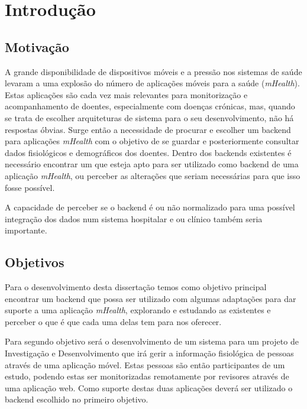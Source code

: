 \chapter{Introdu\c c\~ao}

\section{Motivação}

A grande disponibilidade de dispositivos móveis e a pressão nos sistemas de saúde levaram a uma explosão do número de aplicações móveis para a saúde (\textit{mHealth}). Estas aplicações são cada vez mais relevantes para monitorização e acompanhamento de doentes, especialmente com doenças crónicas, mas, quando se trata de escolher arquiteturas de sistema para o seu desenvolvimento, não há respostas óbvias. Surge então a necessidade de procurar e escolher um backend para aplicações \textit{mHealth} com o objetivo de se guardar e posteriormente consultar dados fisiológicos e demográficos dos doentes.
Dentro dos backends existentes é necessário encontrar um que esteja apto para ser utilizado como backend de uma aplicação \textit{mHealth}, ou perceber as alterações que seriam necessárias para que isso fosse possível. \par
A capacidade de perceber se o backend é ou não normalizado para uma possível integração dos dados num sistema hospitalar e ou clínico também seria importante. 

\section{Objetivos}
Para o desenvolvimento desta dissertação temos como objetivo principal encontrar um backend que possa ser utilizado com algumas adaptações para dar suporte a uma aplicação \textit{mHealth}, explorando e estudando as existentes e perceber o que é que cada uma delas tem para nos oferecer. \par
Para segundo objetivo será o desenvolvimento de um sistema para um projeto de Investigação e Desenvolvimento que irá gerir a informação fisiológica de pessoas através de uma aplicação móvel. Estas pessoas são então participantes de um estudo, podendo estas ser monitorizadas remotamente por revisores através de uma aplicação web. Como suporte destas duas aplicações deverá ser utilizado o backend escolhido no primeiro objetivo.
\cleardoublepage